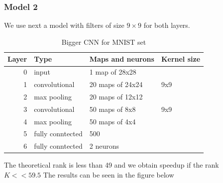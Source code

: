 \documentclass{article} %
\begin{document}
\subsubsection{Model 2}

We use next a model with filters of size $9\times9$ for both layers.

\begin{table}
\centering
\begin{tabular}{@{}rlll@{}}\toprule
Layer & Type & Maps and neurons& Kernel size \\ \midrule
0 & input & 1 map of 28x28 &\\
1& convolutional & 20 maps of 24x24 & 9x9\\
2 & max pooling & 20 maps of 12x12 &  \\
3 & convolutional & 50 maps of 8x8& 9x9 \\
4 & max pooling & 50 maps of 4x4&  \\ 
5 & fully conntected& 500 & \\
6 & fully conntected & 2 neurons & \\ \bottomrule
\end{tabular}
\caption{Bigger CNN for MNIST set}
\label{fig:CNN2}
\end{table}

The theoretical rank is less than 49 and we obtain speedup if the rank $K << 59.5$
The results can be seen in the figure below
\end{document}
